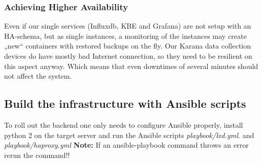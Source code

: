 \subsubsection{Achieving Higher Availability}
Even if our single services (Influxdb, KBE and Grafana) are not setup with an HA-schema, but as single instances, a monitoring of the instances may create „new“ containers with restored backups on the fly. Our Karana data collection devices do have mostly bad Internet connection, so they need to be resilient on this aspect anyway. Which means that even downtimes of several minutes should not affect the system.

\subsection{Build the infrastructure with Ansible scripts}
To roll out the backend one only needs to configure Ansible properly, install python 2 on the target server and run the Ansible scripts \textit{playbook/lxd.yml}. and \textit{playbook/haproxy.yml}
\textbf{Note:} If an ansible-playbook command throws an error rerun the command!!
 
